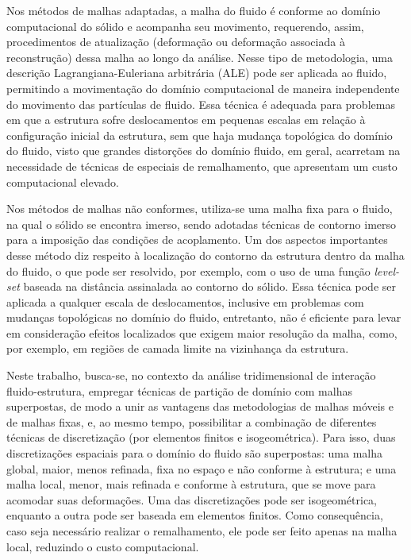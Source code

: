 \documentclass[tese_patricia.tex]{subfiles}
\begin{document}
Nos métodos de malhas adaptadas, a malha do fluido é conforme ao domínio computacional do sólido e acompanha seu movimento, requerendo, assim, procedimentos de atualização (deformação ou deformação associada à reconstrução) dessa malha ao longo da análise. Nesse tipo de metodologia, uma descrição Lagrangiana-Euleriana arbitrária (ALE) pode ser aplicada ao fluido, permitindo a movimentação do domínio computacional de maneira independente do movimento das partículas de fluido. Essa técnica é adequada para problemas em que a estrutura sofre deslocamentos em pequenas escalas em relação à configuração inicial da estrutura, sem que haja mudança topológica do domínio do fluido, visto que grandes distorções do domínio fluido, em geral, acarretam na necessidade de técnicas de especiais de remalhamento, que apresentam um custo computacional elevado.

Nos métodos de malhas não conformes, utiliza-se uma malha fixa para o fluido, na qual o sólido se encontra imerso, sendo adotadas técnicas de contorno imerso para a imposição das condições de acoplamento. Um dos aspectos importantes desse método diz respeito à localização do contorno da estrutura dentro da malha do fluido, o que pode ser resolvido, por exemplo, com o uso de uma função \textit{level-set} baseada na distância assinalada ao contorno do sólido. Essa técnica pode ser aplicada a qualquer escala de deslocamentos, inclusive em problemas com mudanças topológicas no domínio do fluido, entretanto, não é eficiente para levar em consideração efeitos localizados que exigem maior resolução da malha, como, por exemplo, em regiões de camada limite na vizinhança da estrutura.

Neste trabalho, busca-se, no contexto da análise tridimensional de interação fluido-estrutura, empregar técnicas de partição de domínio com malhas superpostas, de modo a unir as vantagens das metodologias de malhas móveis e de malhas fixas, e, ao mesmo tempo, possibilitar a combinação de diferentes técnicas de discretização (por elementos finitos e isogeométrica). Para isso, duas discretizações espaciais para o domínio do fluido são superpostas: uma malha global, maior, menos refinada, fixa no espaço e não conforme à estrutura; e uma malha local, menor, mais refinada e conforme à estrutura, que se move para acomodar suas deformações. Uma das discretizações pode ser isogeométrica, enquanto a outra pode ser baseada em elementos finitos. Como consequência, caso seja necessário realizar o remalhamento, ele pode ser feito apenas na malha local, reduzindo o custo computacional. 
\end{document}
